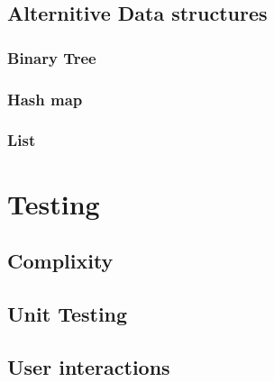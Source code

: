 \documentclass[11pt]{article} %
\begin{document}
	\subsection{Alternitive Data structures}
		\subsubsection{Binary Tree}
		\subsubsection{Hash map}
		\subsubsection{List}
\section{Testing}
	\subsection{Complixity}
	\subsection{Unit Testing}
	\subsection{User interactions}
\end{document}
